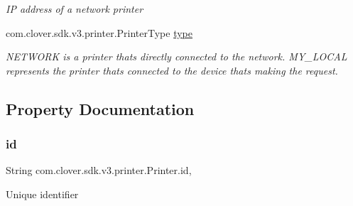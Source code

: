\begin{DoxyCompactItemize}
\begin{DoxyCompactList}\small\item\em IP address of a network printer \end{DoxyCompactList}\item 
com.\+clover.\+sdk.\+v3.\+printer.\+Printer\+Type \hyperlink{classcom_1_1clover_1_1sdk_1_1v3_1_1printer_1_1_printer_ab36bf7ec4bd09ce0ee2562f26b79475c}{type}
\begin{DoxyCompactList}\small\item\em N\+E\+T\+W\+O\+RK is a printer that\textquotesingle{}s directly connected to the network. M\+Y\+\_\+\+L\+O\+C\+AL represents the printer that\textquotesingle{}s connected to the device that\textquotesingle{}s making the request. \end{DoxyCompactList}\end{DoxyCompactItemize}


\subsection{Property Documentation}
\mbox{\label{classcom_1_1clover_1_1sdk_1_1v3_1_1printer_1_1_printer_a6c1405e0e17d04064909c54fff864c52}} 
\subsubsection{\texorpdfstring{id}{id}}
{\footnotesize\ttfamily String com.\+clover.\+sdk.\+v3.\+printer.\+Printer.\+id\hspace{0.3cm}{\ttfamily [get]}, {\ttfamily [set]}}



Unique identifier 

\mbox{\label{classcom_1_1clover_1_1sdk_1_1v3_1_1printer_1_1_printer_a25c08767d6d7cb105bf451f458e97c70}} 
